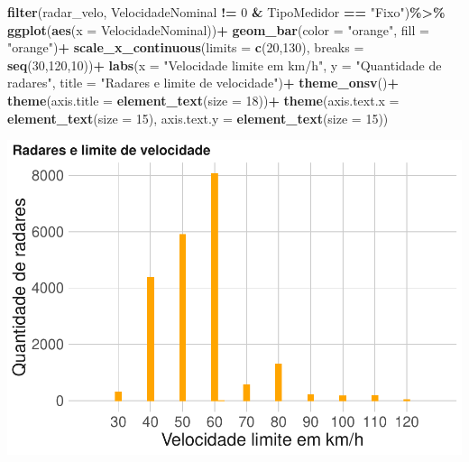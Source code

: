 \documentclass[
]{book}
\newenvironment{Shaded}{\begin{snugshade}}{\end{snugshade}}
\newcommand{\AttributeTok}[1]{\textcolor[rgb]{0.13,0.29,0.53}{#1}}
\newcommand{\DecValTok}[1]{\textcolor[rgb]{0.00,0.00,0.81}{#1}}
\newcommand{\FunctionTok}[1]{\textcolor[rgb]{0.13,0.29,0.53}{\textbf{#1}}}
\newcommand{\NormalTok}[1]{#1}
\newcommand{\SpecialCharTok}[1]{\textcolor[rgb]{0.81,0.36,0.00}{\textbf{#1}}}
\newcommand{\StringTok}[1]{\textcolor[rgb]{0.31,0.60,0.02}{#1}}
\begin{document}
\begin{Shaded}
\begin{Highlighting}[]
\FunctionTok{filter}\NormalTok{(radar\_velo, VelocidadeNominal }\SpecialCharTok{!=} \DecValTok{0} \SpecialCharTok{\&}\NormalTok{ TipoMedidor }\SpecialCharTok{==} \StringTok{"Fixo"}\NormalTok{)}\SpecialCharTok{\%\textgreater{}\%} 
  \FunctionTok{ggplot}\NormalTok{(}\FunctionTok{aes}\NormalTok{(}\AttributeTok{x =}\NormalTok{ VelocidadeNominal))}\SpecialCharTok{+}
  \FunctionTok{geom\_bar}\NormalTok{(}\AttributeTok{color =} \StringTok{"orange"}\NormalTok{, }\AttributeTok{fill =} \StringTok{"orange"}\NormalTok{)}\SpecialCharTok{+}
  \FunctionTok{scale\_x\_continuous}\NormalTok{(}\AttributeTok{limits =} \FunctionTok{c}\NormalTok{(}\DecValTok{20}\NormalTok{,}\DecValTok{130}\NormalTok{),}
                     \AttributeTok{breaks =} \FunctionTok{seq}\NormalTok{(}\DecValTok{30}\NormalTok{,}\DecValTok{120}\NormalTok{,}\DecValTok{10}\NormalTok{))}\SpecialCharTok{+}
  \FunctionTok{labs}\NormalTok{(}\AttributeTok{x =} \StringTok{"Velocidade limite em km/h"}\NormalTok{,}
       \AttributeTok{y =} \StringTok{"Quantidade de radares"}\NormalTok{,}
       \AttributeTok{title =} \StringTok{"Radares e limite de velocidade"}\NormalTok{)}\SpecialCharTok{+}
  \FunctionTok{theme\_onsv}\NormalTok{()}\SpecialCharTok{+}
  \FunctionTok{theme}\NormalTok{(}\AttributeTok{axis.title =} \FunctionTok{element\_text}\NormalTok{(}\AttributeTok{size =} \DecValTok{18}\NormalTok{))}\SpecialCharTok{+}
  \FunctionTok{theme}\NormalTok{(}\AttributeTok{axis.text.x =} \FunctionTok{element\_text}\NormalTok{(}\AttributeTok{size =} \DecValTok{15}\NormalTok{),}
        \AttributeTok{axis.text.y =} \FunctionTok{element\_text}\NormalTok{(}\AttributeTok{size =} \DecValTok{15}\NormalTok{)) }
\end{Highlighting}
\end{Shaded}

\includegraphics{RelatorioVelocidades_files/figure-latex/unnamed-chunk-20-1.pdf}
\end{document}
